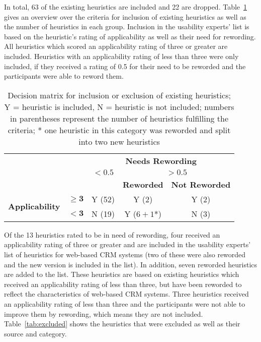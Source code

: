 In total, 63 of the existing heuristics are included and 22 are dropped. Table~\ref{tab:first_inclusion_matrix} gives an overview over the criteria for inclusion of existing heuristics as well as the number of heuristics in each group. Inclusion in the usability experts' list is based on the heuristic's rating of applicability as well as their need for rewording. All heuristics which scored an applicability rating of three or greater are included. Heuristics with an applicability rating of less than three were only included, if they received a rating of 0.5 for their need to be reworded and the participants were able to reword them.

\begin{table}[htbp]
	\centering
	\vspace{0.5cm}
	\caption[Decision matrix for inclusion or exclusion of existing heuristics]{Decision matrix for inclusion or exclusion of existing heuristics; Y = heuristic is included, N = heuristic is not included; numbers in parentheses represent the number of heuristics fulfilling the criteria; * one heuristic in this category was reworded and split into two new heuristics}
	\label{tab:first_inclusion_matrix}
	\begin{tabular}{ccccc}	\toprule
		& & \multicolumn{3}{c}{\textbf{Needs Rewording}} \\ \cmidrule(l){3-5}
		& & $\mathbf{\boldsymbol{<}0.5}$ & \multicolumn{2}{c}{$\mathbf{\boldsymbol{>}0.5}$} \\ \cmidrule(l){4-5}
		& & & \textbf{Reworded} & \textbf{Not Reworded} \\ \midrule
		\multirow{2}{*}{\textbf{Applicability}} & $\mathbf{\boldsymbol{\geq}3}$ & Y (52) & Y (2) & Y (2) \\
		& $\mathbf{\boldsymbol{<}3}$ 	& N (19) & Y ($6+1$*) & N (3) \\
		\bottomrule
	\end{tabular}
\end{table}

Of the 13 heuristics rated to be in need of rewording, four received an applicability rating of three or greater and are included in the usability experts' list of heuristics for web-based CRM systems (two of these were also reworded and the new version is included in the list). In addition, seven reworded heuristics are added to the list. These heuristics are based on existing heuristics which received an applicability rating of less than three, but have been reworded to reflect the characteristics of web-based CRM systems. Three heuristics received an applicability rating of less than three and the participants were not able to improve them by rewording, which means they are not included. Table~\ref{tab:excluded} shows the heuristics that were excluded  as well as their source and category.


